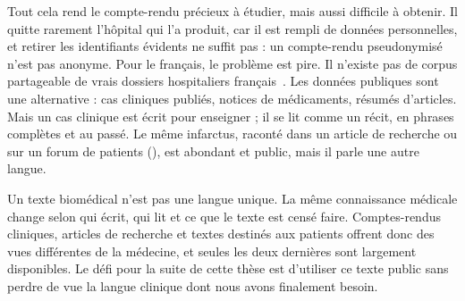 Tout cela rend le compte-rendu précieux à étudier, mais aussi difficile à obtenir. Il
quitte rarement l'hôpital qui l'a produit, car il est rempli de données personnelles,
et retirer les identifiants évidents ne suffit pas : un compte-rendu pseudonymisé
n'est pas anonyme. Pour le français, le problème est pire. Il n'existe pas de corpus
partageable de vrais dossiers hospitaliers français~\citep{neveol_clinical_2018}. Les
données publiques sont une alternative : cas cliniques publiés, notices de
médicaments, résumés d'articles. Mais un cas clinique est écrit pour enseigner ; il se
lit comme un récit, en phrases complètes et au passé. Le même infarctus, raconté dans
un article de recherche ou sur un forum de patients (), est abondant
et public, mais il parle une autre langue.

\begin{center}
\label{fig:bt-web}
\end{center}
\medskip

Un texte biomédical n'est pas une langue unique. La même connaissance médicale change
selon qui écrit, qui lit et ce que le texte est censé faire. Comptes-rendus cliniques,
articles de recherche et textes destinés aux patients offrent donc des vues
différentes de la médecine, et seules les deux dernières sont largement disponibles.
Le défi pour la suite de cette thèse est d'utiliser ce texte public sans perdre de vue
la langue clinique dont nous avons finalement besoin.
